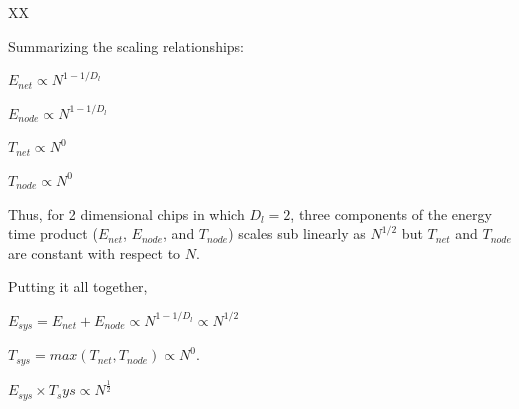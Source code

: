 \documentclass[12pt]{article}
\begin{document}
XX


Summarizing the scaling relationships: 

$E_{net} \propto N^{1-1/D_l}$

$E_{node} \propto N^{1-1/D_l}$

$T_{net} \propto N^0$

$T_{node} \propto N^{0}$

Thus, for 2 dimensional chips in which $D_l = 2$, three components of the
energy time product ($E_{net}$, $E_{node}$, and $T_{node}$) scales sub linearly
as $N^{1/2}$ but $T_{net}$ and $T_{node}$ are constant with respect to $N$.


Putting it all together, 

$E_{sys} = E_{net} + E_{node} \propto N^{1-1/D_l} \propto N^{1/2}$ 

$T_{sys}  = max(T_{net}, T_{node}) \propto N^0$.

$E_{sys} \times T_sys \propto N^{\frac{1}{2}}$
%
%
%
%
\end{document}
